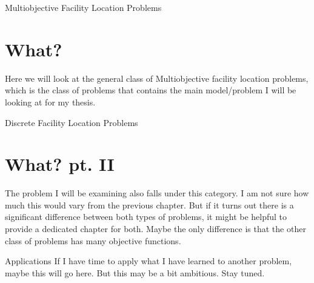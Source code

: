 \documentclass[12pt]{pom_thesis}
\theoremstyle{definition}
\begin{document}
\begin{chapter}{Multiobjective Facility Location Problems}
\section{What?}
Here we will look at the general class of Multiobjective facility location problems, which is the class of problems that contains the main model/problem I will be looking at for my thesis. 
\end{chapter}

\begin{chapter}{Discrete Facility Location Problems}
\section{What? pt. II}
The problem I will be examining also falls under this category. I am not sure how much this would vary from the previous chapter. But if it turns out there is a significant difference between both types of problems, it might be helpful to provide a dedicated chapter for both. Maybe the only difference is that the other class of problems has many objective functions.
\end{chapter}

\begin{chapter}{Applications}
If I have time to apply what I have learned to another problem, maybe this will go here. But this may be a bit ambitious. Stay tuned.
\end{chapter}
\end{document}
